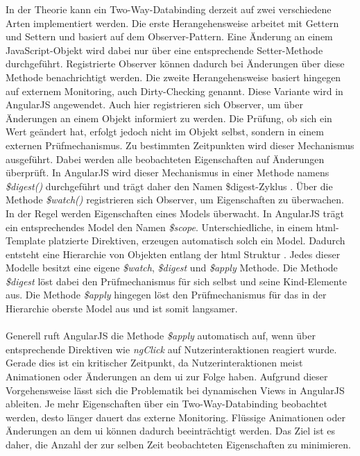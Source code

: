 In der Theorie kann ein Two-Way-Databinding derzeit auf zwei verschiedene Arten implementiert werden\cite{SBDataBinding}. Die erste Herangehensweise arbeitet mit Gettern und Settern und basiert auf dem Observer-Pattern. Eine Änderung an einem JavaScript-Objekt wird dabei nur über eine entsprechende Setter-Methode durchgeführt. Registrierte Observer können dadurch bei Änderungen über diese Methode benachrichtigt werden. Die zweite Herangehensweise basiert hingegen auf externem Monitoring, auch \glqq Dirty-Checking\grqq{} genannt. Diese Variante wird in AngularJS angewendet. Auch hier registrieren sich Observer, um über Änderungen an einem Objekt informiert zu werden. Die Prüfung, ob sich ein Wert geändert hat, erfolgt jedoch nicht im Objekt selbst, sondern in einem externen Prüfmechanismus. Zu bestimmten Zeitpunkten wird dieser Mechanismus ausgeführt. Dabei werden alle beobachteten Eigenschaften auf Änderungen überprüft. In AngularJS wird dieser Mechanismus in einer Methode namens \emph{\$digest()} durchgeführt und trägt daher den Namen \$digest-Zyklus \cite{SBDataBinding}. Über die Methode \emph{\$watch()} registrieren sich Observer, um Eigenschaften zu überwachen. In der Regel werden Eigenschaften eines Models überwacht. In AngularJS trägt ein entsprechendes Model den Namen \emph{\$scope}. Unterschiedliche, in einem \gls{html}-Template platzierte Direktiven, erzeugen automatisch solch ein Model. Dadurch entsteht eine Hierarchie von Objekten entlang der \gls{html} Struktur \cite{AJSScopes}. Jedes dieser Modelle besitzt eine eigene \emph{\$watch}, \emph{\$digest} und \emph{\$apply} Methode. Die Methode \emph{\$digest} löst dabei den Prüfmechanismus für sich selbst und seine Kind-Elemente aus. Die Methode \emph{\$apply} hingegen löst den Prüfmechanismus für das in der Hierarchie oberste Model aus und ist somit langsamer. \cite{PSApplyDigest}
\\\\
Generell ruft AngularJS die Methode \emph{\$apply} automatisch auf, wenn über entsprechende Direktiven wie \emph{ngClick} auf Nutzerinteraktionen reagiert wurde. Gerade dies ist ein kritischer Zeitpunkt, da Nutzerinteraktionen meist Animationen oder Änderungen an dem \gls{ui} zur Folge haben. Aufgrund dieser Vorgehensweise lässt sich die Problematik bei dynamischen Views in AngularJS ableiten. Je mehr Eigenschaften über ein Two-Way-Databinding beobachtet werden, desto länger dauert das externe Monitoring. Flüssige Animationen oder Änderungen an dem \gls{ui} können dadurch beeinträchtigt werden. Das Ziel ist es daher, die Anzahl der zur selben Zeit beobachteten Eigenschaften zu minimieren.

